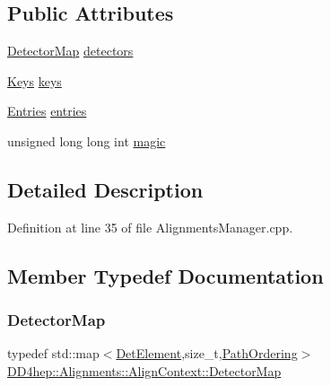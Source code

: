 \subsection*{Public Attributes}
\begin{DoxyCompactItemize}
\item 
\hyperlink{class_d_d4hep_1_1_alignments_1_1_align_context_a87b50a8f7563aefb2944aebe2d5bb33e}{Detector\+Map} \hyperlink{class_d_d4hep_1_1_alignments_1_1_align_context_a752624c02c61692d9e56cfccd43adaa7}{detectors}
\item 
\hyperlink{class_d_d4hep_1_1_alignments_1_1_align_context_afed2b1b68f90bb0129bd51a08904332b}{Keys} \hyperlink{class_d_d4hep_1_1_alignments_1_1_align_context_ab4f2ddd57d4f86566bb37d5c6779b6d2}{keys}
\item 
\hyperlink{class_d_d4hep_1_1_alignments_1_1_align_context_a1b5a088a6d88177089055193c11aa67c}{Entries} \hyperlink{class_d_d4hep_1_1_alignments_1_1_align_context_a7ac8a0b3a176098807efafdc3a429cd5}{entries}
\item 
unsigned long long int \hyperlink{class_d_d4hep_1_1_alignments_1_1_align_context_ab1fa723ae13a70098621bf9f91decf62}{magic}
\end{DoxyCompactItemize}


\subsection{Detailed Description}


Definition at line 35 of file Alignments\+Manager.\+cpp.



\subsection{Member Typedef Documentation}
\hypertarget{class_d_d4hep_1_1_alignments_1_1_align_context_a87b50a8f7563aefb2944aebe2d5bb33e}{}\label{class_d_d4hep_1_1_alignments_1_1_align_context_a87b50a8f7563aefb2944aebe2d5bb33e} 
\subsubsection{\texorpdfstring{Detector\+Map}{DetectorMap}}
{\footnotesize\ttfamily typedef std\+::map$<$\hyperlink{class_d_d4hep_1_1_geometry_1_1_det_element}{Det\+Element},size\+\_\+t,\hyperlink{struct_d_d4hep_1_1_alignments_1_1_align_context_1_1_path_ordering}{Path\+Ordering}$>$ \hyperlink{class_d_d4hep_1_1_alignments_1_1_align_context_a87b50a8f7563aefb2944aebe2d5bb33e}{D\+D4hep\+::\+Alignments\+::\+Align\+Context\+::\+Detector\+Map}}



